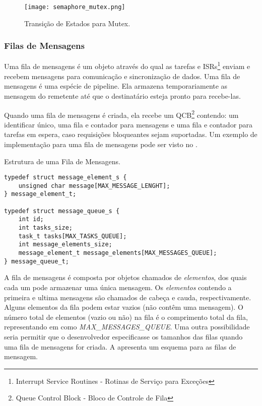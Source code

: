 \begin{figure}[htb]
	\centering
	\texttt{[image: semaphore\_mutex.png]}
	\caption{Transição de Estados para Mutex.}
	\label{fig:semaphore_mutex}
\end{figure}

\subsubsection{Filas de Mensagens}

Uma fila de mensagens é um objeto através do qual as tarefas e ISRs\footnote{Interrupt Service Routines - Rotinas de Serviço para Exceções} enviam e recebem mensagens para comunicação e sincronização de dados. Uma fila de mensagens é uma espécie de pipeline. Ela armazena temporariamente as mensagem do remetente até que o destinatário esteja pronto para recebe-las. %

Quando uma fila de mensagens é criada, ela recebe um QCB\footnote{Queue Control Block - Bloco de Controle de Fila} contendo: um identificar único, uma fila e contador para mensagens e uma fila e contador para tarefas em espera, caso requisições bloqueantes sejam suportadas. Um exemplo de implementação para uma fila de mensagens pode ser visto no .

\begin{listing}
	\caption{Estrutura de uma Fila de Mensagens.}
	\label{alg:struct_message_queue}
	\centering
	\begin{verbatim}
typedef struct message_element_s {
	unsigned char message[MAX_MESSAGE_LENGHT];	
} message_element_t;

typedef struct message_queue_s {
	int id;
	int tasks_size;
	task_t tasks[MAX_TASKS_QUEUE];
	int message_elements_size;
	message_element_t message_elements[MAX_MESSAGES_QUEUE];
} message_queue_t;
	\end{verbatim}
\end{listing}

A fila de mensagens é composta por objetos chamados de \emph{elementos}, dos quais cada um pode armazenar uma única mensagem. Os \emph{elementos} contendo a primeira e ultima mensagens são chamados de cabeça e cauda, respectivamente. Alguns elementos da fila podem estar vazios (não contêm uma mensagem). O número total de elementos (vazio ou não) na fila é o comprimento total da fila, representando em  como \emph{MAX\_MESSAGES\_QUEUE}. Uma outra possibilidade seria permitir que o desenvolvedor especificasse os tamanhos das filas quando uma fila de mensagens for criada. A  apresenta um esquema para as filas de mensagem.

